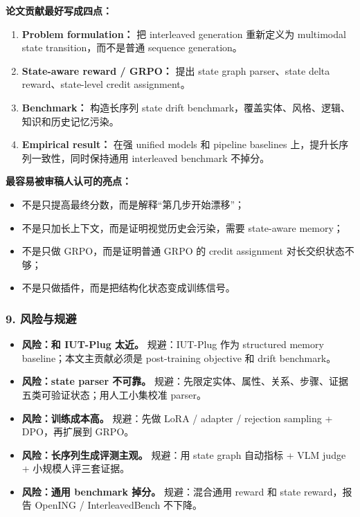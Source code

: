 \textbf{论文贡献最好写成四点：}

\begin{enumerate}[leftmargin=1.5em]
  \item \textbf{Problem formulation：} 把 interleaved generation 重新定义为 multimodal state transition，而不是普通 sequence generation。
  \item \textbf{State-aware reward / GRPO：} 提出 state graph parser、state delta reward、state-level credit assignment。
  \item \textbf{Benchmark：} 构造长序列 state drift benchmark，覆盖实体、风格、逻辑、知识和历史记忆污染。
  \item \textbf{Empirical result：} 在强 unified models 和 pipeline baselines 上，提升长序列一致性，同时保持通用 interleaved benchmark 不掉分。
\end{enumerate}

\textbf{最容易被审稿人认可的亮点：}

\begin{itemize}[leftmargin=1.5em]
  \item 不是只提高最终分数，而是解释“第几步开始漂移”；
  \item 不是只加长上下文，而是证明视觉历史会污染，需要 state-aware memory；
  \item 不是只做 GRPO，而是证明普通 GRPO 的 credit assignment 对长交织状态不够；
  \item 不是只做插件，而是把结构化状态变成训练信号。
\end{itemize}

\subsubsection*{9. 风险与规避}

\begin{itemize}[leftmargin=1.5em]
  \item \textbf{风险：和 IUT-Plug 太近。} 规避：IUT-Plug 作为 structured memory baseline；本文主贡献必须是 post-training objective 和 drift benchmark。
  \item \textbf{风险：state parser 不可靠。} 规避：先限定实体、属性、关系、步骤、证据五类可验证状态；用人工小集校准 parser。
  \item \textbf{风险：训练成本高。} 规避：先做 LoRA / adapter / rejection sampling + DPO，再扩展到 GRPO。
  \item \textbf{风险：长序列生成评测主观。} 规避：用 state graph 自动指标 + VLM judge + 小规模人评三套证据。
  \item \textbf{风险：通用 benchmark 掉分。} 规避：混合通用 reward 和 state reward，报告 OpenING / InterleavedBench 不下降。
\end{itemize}

